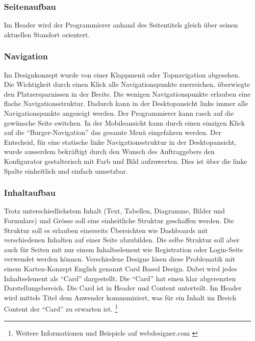 \subsubsection{Seitenaufbau}\label{seitenaufbau}

Im Header wird der Programmierer anhand des Seitentitels gleich über
seinen aktuellen Standort orientert.

\subsubsection{Navigation}\label{navigation}

Im Designkonzept wurde von einer Klappmenü oder Topnavigation abgesehen.
Die Wichtigkeit durch einen Klick alle Navigationspunkte zuerreichen,
überwiegte den Platzersparnissen in der Breite. Die wenigen
Navigationspunkte erlauben eine flache Navigationsstruktur. Dadurch kann
in der Desktopansicht links immer alle Navigationspunkte angezeigt
werden. Der Programmierer kann rasch auf die gewünsche Seite switchen.
In der Mobileansicht kann durch einen einzigen Klick auf die
``Burger-Navigation'' das gesamte Menü eingefahren werden. Der
Entscheid, für eine statische linke Navigationsstruktur in der
Desktopansicht, wurde ausserdem bekräftigt durch den Wunsch des
Auftraggebers den Konfigurator gestalterisch mit Farb und Bild
aufzuwerten. Dies ist über die linke Spalte einheitlich und einfach
umsetzbar.

\newpage

\subsubsection{Inhaltaufbau}\label{inhaltaufbau}

Trotz unterschiedlichstem Inhalt (Text, Tabellen, Diagramme, Bilder und
Formulare) und Grösse soll eine einheitliche Struktur geschaffen werden.
Die Struktur soll es erlauben einerseits Übersichten wie Dashboards mit
verschiedenen Inhalten auf einer Seite abzubilden. Die selbe Struktur
soll aber auch für Seiten mit nur einem Inhaltselement wie Registration
oder Login-Seite verwendet werden können. Verschiedene Designe lösen
diese Problematik mit einem Karten-Konzept English genannt Card Based
Design. Dabei wird jedes Inhaltselement als ``Card'' dargestellt. Die
``Card'' hat einen klar abgerenzten Darstellungsbereich. Die Card ist in
Header und Content unterteilt. Im Header wird mittels Titel dem Anwender
kommuniziert, was für ein Inhalt im Breich Content der ``Card'' zu
erwarten ist. \footnote{Weitere Informationen und Beispiele auf
  webdesigner.com \autocite{card-based-design}}

